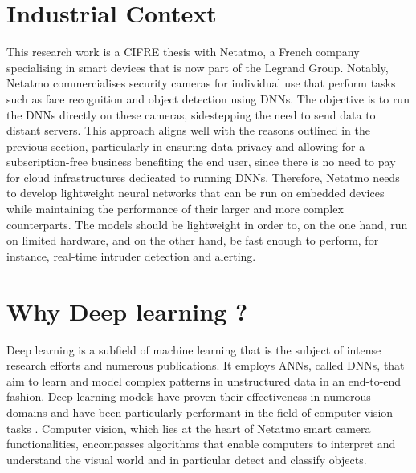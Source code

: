 \section{Industrial Context}


This research work is a CIFRE thesis with Netatmo, a French company specialising
in smart devices that is now part of the Legrand Group. Notably, Netatmo
commercialises security cameras for individual use that perform tasks such as
face recognition and object detection using \acp{DNN}. The objective is to run
the \acp{DNN} directly on these cameras, sidestepping the need to send data to
distant servers. This approach aligns well with the reasons outlined in the
previous section, particularly in ensuring data privacy and allowing for a
subscription-free business benefiting the end user, since there is no need to
pay for cloud infrastructures dedicated to running \acp{DNN}. Therefore, Netatmo
needs to develop lightweight neural networks that can be run on embedded devices
while maintaining the performance of their larger and more complex counterparts.
The models should be lightweight in order to, on the one hand, run on limited
hardware, and on the other hand, be fast enough to perform, for instance,
real-time intruder detection and alerting.\\

\section{Why Deep learning ?}

Deep learning is a subfield of machine learning that is the subject of intense
research efforts and numerous publications. It employs \aclp{ANN}, called
\acfp{DNN}, that aim to learn and model complex patterns in unstructured data in
an end-to-end fashion. Deep learning models have proven their effectiveness in
numerous domains and have been particularly performant in the field of computer
vision tasks
\cite{DBLP:conf/cvpr/HeZRS16,DBLP:conf/nips/RenHGS15,DBLP:conf/eccv/LiuAESRFB16}.
Computer vision, which lies at the heart of Netatmo smart camera
functionalities, encompasses algorithms that enable computers to interpret and
understand the visual world and in particular detect and classify objects.\\

